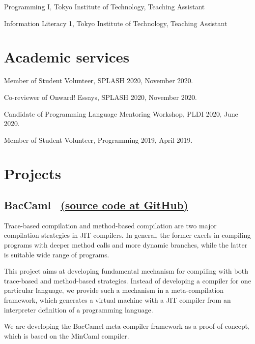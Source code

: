 \documentclass[11pt]{article} %
\newcommand{\伊澤侑祐}{\underline{伊澤侑祐}}
\newcommand{\jit}{\textsc{JIT} }
\begin{document}
 Programming I, Tokyo Institute of Technology, Teaching Assistant

 Information Literacy 1, Tokyo Institute of Technology, Teaching Assistant


\section*{Academic services}

 Member of Student Volunteer, SPLASH 2020, November 2020.

 Co-reviewer of Onward! Essays, SPLASH 2020, November 2020.

 Candidate of Programming Language Mentoring Workshop, PLDI 2020, June 2020.

 Member of Student Volunteer, Programming 2019, April 2019.

\section*{Projects}

\subsection*{BacCaml \, \href{https://github.com/prg-titech/baccaml}{(source code at GitHub)}}

\medskip

Trace-based compilation and method-based compilation are two major compilation
strategies in \jit compilers. In general, the former excels in  compiling
programs with deeper method calls and more dynamic branches, while  the latter
is suitable wide range of programs.

\medskip

This project aims at developing fundamental mechanism for compiling with both
trace-based and method-based strategies. Instead of developing  a compiler for
one particular language, we provide such a mechanism in a meta-compilation
framework, which generates a virtual machine with a \jit compiler from an
interpreter definition of a programming language.

\medskip

We are developing the BacCamel meta-compiler framework as a proof-of-concept,
which is based on the MinCaml compiler.

\medskip
\end{document}
